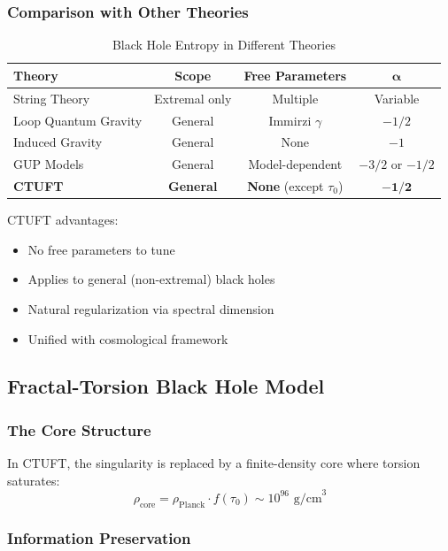 \subsubsection{Comparison with Other Theories}

\begin{table}[h]
\centering
\caption{Black Hole Entropy in Different Theories}
\begin{tabular}{lccc}
\toprule
\textbf{Theory} & \textbf{Scope} & \textbf{Free Parameters} & $\mathbf{\alpha}$ \\
\midrule
String Theory & Extremal only & Multiple & Variable \\
Loop Quantum Gravity & General & Immirzi $\gamma$ & $-1/2$ \\
Induced Gravity & General & None & $-1$ \\
GUP Models & General & Model-dependent & $-3/2$ or $-1/2$ \\
\textbf{CTUFT} & \textbf{General} & \textbf{None} (except $\tau_0$) & $\mathbf{-1/2}$ \\
\bottomrule
\end{tabular}
\end{table}

CTUFT advantages:
\begin{itemize}
    \item No free parameters to tune
    \item Applies to general (non-extremal) black holes
    \item Natural regularization via spectral dimension
    \item Unified with cosmological framework
\end{itemize}

\subsection{Fractal-Torsion Black Hole Model}

\subsubsection{The Core Structure}

In CTUFT, the singularity is replaced by a finite-density core where torsion saturates:
\begin{equation}
    \rho_{\text{core}} = \rho_{\text{Planck}} \cdot f(\tau_0) \sim 10^{96} \text{ g/cm}^3
\end{equation}

\subsubsection{Information Preservation}

